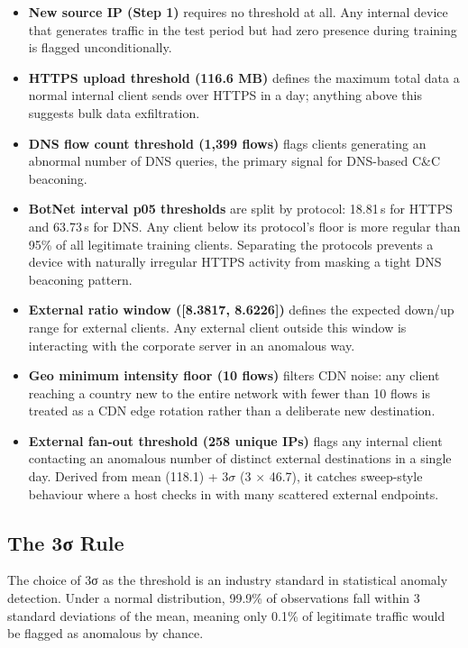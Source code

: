 \documentclass[
  11pt,
]{article}
\begin{document}
\begin{itemize}
  \item \textbf{New source IP (Step 1)} requires no threshold at all. Any internal device that generates traffic in the test period but had zero presence during training is flagged unconditionally.
  \item \textbf{HTTPS upload threshold (116.6 MB)} defines the maximum total data a normal internal client sends over HTTPS in a day; anything above this suggests bulk data exfiltration. 
  \item \textbf{DNS flow count threshold (1,399 flows)} flags clients generating an abnormal number of DNS queries, the primary signal for DNS-based C\&C beaconing.
  \item \textbf{BotNet interval p05 thresholds} are split by protocol: 18.81\,s for HTTPS and 63.73\,s for DNS. Any client below its protocol's floor is more regular than 95\% of all legitimate training clients. Separating the protocols prevents a device with naturally irregular HTTPS activity from masking a tight DNS beaconing pattern.
  \item \textbf{External ratio window ([8.3817, 8.6226])} defines the expected down/up range for external clients. Any external client outside this window is interacting with the corporate server in an anomalous way.
  \item \textbf{Geo minimum intensity floor (10 flows)} filters CDN noise: any client reaching a country new to the entire network with fewer than 10 flows is treated as a CDN edge rotation rather than a deliberate new destination.
  \item \textbf{External fan-out threshold (258 unique IPs)} flags any internal client contacting an anomalous number of distinct external destinations in a single day. Derived from mean (118.1) + 3$\sigma$ (3 $\times$ 46.7), it catches sweep-style behaviour where a host checks in with many scattered external endpoints.
\end{itemize}

\hypertarget{the-3ux3c3-rule}{%
\subsection{The 3σ Rule}\label{the-3ux3c3-rule}}

The choice of 3σ as the threshold is an industry standard in statistical
anomaly detection. Under a normal distribution, 99.9\% of observations
fall within 3 standard deviations of the mean, meaning only 0.1\% of
legitimate traffic would be flagged as anomalous by chance.
\end{document}
